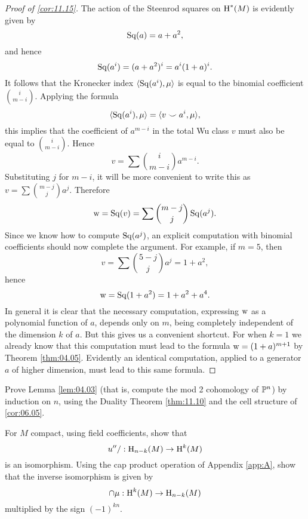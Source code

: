 \documentclass[../main]{subfiles}
\begin{document}
\begin{proof}[Proof of \ref{cor:11.15}]
The action of the Steenrod squares on $\operatorname{H}^\ast(M)$ is evidently given by
\[
\operatorname{Sq}(a) = a+a^2,
\]
and hence
\[
\operatorname{Sq}(a^i) = (a+a^2)^i = a^i (1+a)^i.
\]
It follows that the Kronecker index $\langle \operatorname{Sq}(a^i), \mu \rangle$ is equal to the binomial coefficient $\binom{i}{m-i}$. Applying the formula
\[
\langle \operatorname{Sq}(a^i), \mu \rangle
=
\langle v\smile a^i, \mu \rangle,
\]
this implies that the coefficient of $a^{m-i}$ in the total Wu class $v$ must also be equal to $\binom{i}{m-i}$. Hence
\[
v = \sum \binom{i}{m-i} a^{m-i}.
\]
Substituting $j$ for $m-i$, it will be more convenient to write this as $v = \sum \binom{m-j}{j} a^j$. Therefore
\[
\operatorname{w} = \operatorname{Sq}(v) = \sum \binom{m-j}{j} \operatorname{Sq}(a^j).
\]
Since we know how to compute $\operatorname{Sq}(a^j)$, an explicit computation with binomial coefficients should now complete the argument. For example, if $m=5$, then
\[
v = \sum \binom{5-j}{j} a^j = 1+a^2,
\]
hence
\[
\operatorname{w} = \operatorname{Sq}(1+a^2) = 1+a^2+a^4.
\]
In general it is clear that the necessary computation, expressing $\operatorname{w}$ as a polynomial function of $a$, depends only on $m$, being completely independent of the dimension $k$ of $a$. But this gives us a convenient shortcut. For when $k=1$ we already know that this computation must lead to the formula $\operatorname{w}=(1+a)^{m+1}$ by Theorem \ref{thm:04.05}. Evidently an identical computation, applied to a generator $a$ of higher dimension, must lead to this same formula.
\end{proof}


\begin{problem}
\label{prob:11.A}
Prove Lemma \ref{lem:04.03} (that is, compute the mod 2 cohomology of $\mathbb{P}^n$) by induction on $n$, using the Duality Theorem \ref{thm:11.10} and the cell structure of \ref{cor:06.05}.
\end{problem}

\begin{problem}
\label{prob:11.B}
  For $M$ compact, using field coefficients, show that
\[
u''/: \operatorname{H}_{n-k}(M) \to \operatorname{H}^k(M)
\]
is an isomorphism. Using the cap product operation of Appendix \ref{app:A}, show that the inverse isomorphism is given by
\[
\cap \mu : \operatorname{H}^k(M) \to \operatorname{H}_{n-k}(M)
\]
multiplied by the sign $(-1)^{kn}$.
\end{problem}
\end{document}
